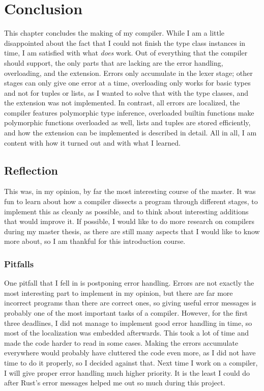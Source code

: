 \chapter{Conclusion}
This chapter concludes the making of my compiler. While I am a little disappointed about the fact that I could not finish the type class instances in time, I am satisfied with what \textit{does} work. Out of everything that the compiler should support, the only parts that are lacking are the error handling, overloading, and the extension. Errors only accumulate in the lexer stage; other stages can only give one error at a time, overloading only works for basic types and not for tuples or lists, as I wanted to solve that with the type classes, and the extension was not implemented. In contrast, all errors are localized, the compiler features polymorphic type inference, overloaded builtin functions make polymorphic functions overloaded as well, lists and tuples are stored efficiently, and how the extension can be implemented is described in detail. All in all, I am content with how it turned out and with what I learned.

\section{Reflection}
This was, in my opinion, by far the most interesting course of the master. It was fun to learn about how a compiler dissects a program through different stages, to implement this as cleanly as possible, and to think about interesting additions that would improve it. If possible, I would like to do more research on compilers during my master thesis, as there are still many aspects that I would like to know more about, so I am thankful for this introduction course.

\subsection{Pitfalls}
One pitfall that I fell in is postponing error handling. Errors are not exactly the most interesting part to implement in my opinion, but there are far more incorrect programs than there are correct ones, so giving useful error messages is probably one of the most important tasks of a compiler. However, for the first three deadlines, I did not manage to implement good error handling in time, so most of the localization was embedded afterwards. This took a lot of time and made the code harder to read in some cases. Making the errors accumulate everywhere would probably have cluttered the code even more, as I did not have time to do it properly, so I decided against that. Next time I work on a compiler, I will give proper error handling much higher priority. It is the least I could do after Rust's error messages helped me out so much during this project.

